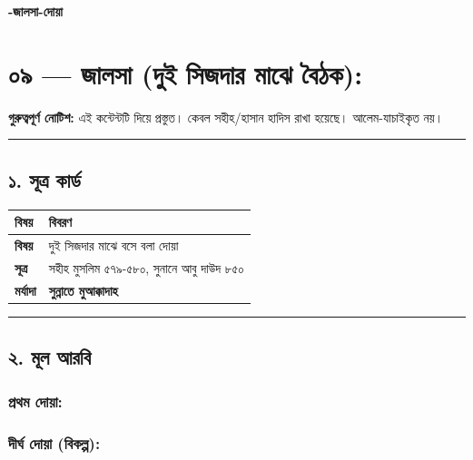 

\begin{center}{\Large\bfseries\color{emerald} -জালসা-দোয়া}\end{center}
\vspace{1em}
\section*{০৯ — জালসা (দুই সিজদার মাঝে বৈঠক): \textit{ }}

\begin{warnbox}
 \textbf{গুরুত্বপূর্ণ নোটিশ:} এই কন্টেন্টটি  দিয়ে প্রস্তুত। কেবল সহীহ/হাসান হাদিস রাখা হয়েছে। আলেম-যাচাইকৃত নয়।
\end{warnbox}

\medskip\hrule\medskip

\subsection*{১. সূত্র কার্ড}

\begin{table}[h]\centering\small
\begin{tabular}{ll}
বিষয় & বিবরণ \\
\hline
\textbf{বিষয়} & দুই সিজদার মাঝে বসে বলা দোয়া \\
\textbf{সূত্র} & সহীহ মুসলিম ৫৭৯-৫৮০, সুনানে আবু দাউদ ৮৫০ \\
\textbf{মর্যাদা} & \textbf{সুন্নাতে মুআক্কাদাহ} \\
\hline
\end{tabular}
\end{table}

\medskip\hrule\medskip

\subsection*{২. মূল আরবি}

\subsubsection*{\textbf{প্রথম দোয়া:}}
\begin{center}\end{center}

\subsubsection*{\textbf{দীর্ঘ দোয়া (বিকল্প):}}
\begin{center}\end{center}

